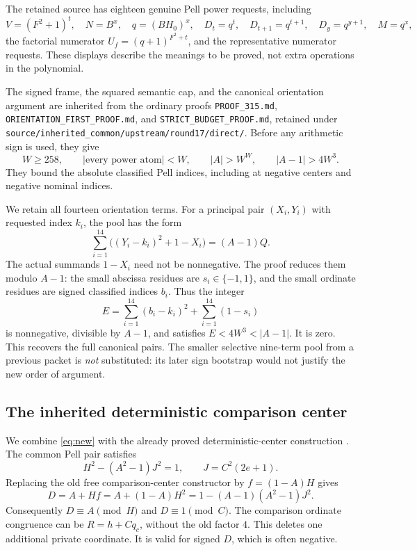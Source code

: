 \documentclass[11pt,letterpaper]{article}
\newcommand{\file}[1]{\texttt{\nolinkurl{#1}}}
\begin{document}
The retained source has eighteen genuine Pell power requests, including
\[
 V=(F^2+1)^t,\quad N=B^x,\quad q=(BH_0)^x,\quad
 D_t=q^t,\quad D_{t+1}=q^{t+1},\quad D_y=q^{y+1},\quad M=q^x,
\]
the factorial numerator $U_f=(q+1)^{F^2+t}$, and the representative
numerator requests. These displays describe the meanings to be proved,
not extra operations in the polynomial.

The signed frame, the squared semantic cap, and the canonical
orientation argument are inherited from the ordinary proofs
\file{PROOF_315.md}, \file{ORIENTATION_FIRST_PROOF.md}, and
\file{STRICT_BUDGET_PROOF.md}, retained under
\file{source/inherited_common/upstream/round17/direct/}.
Before any arithmetic sign is used, they give
\[
 W\ge258,\qquad |\text{every power atom}|<W,\qquad
 |A|>W^W,\qquad |A-1|>4W^3.
\]
They bound the absolute classified Pell indices, including at negative
centers and negative nominal indices.

We retain all fourteen orientation terms. For a principal pair
$(X_i,Y_i)$ with requested index $k_i$, the pool has the form
\begin{equation}\label{eq:pool}
 \sum_{i=1}^{14}\bigl((Y_i-k_i)^2+1-X_i\bigr)=(A-1)Q.
\end{equation}
The actual summands $1-X_i$ need not be nonnegative. The proof reduces
them modulo $A-1$: the small abscissa residues are
$s_i\in\{-1,1\}$, and the small ordinate residues are signed classified
indices $b_i$. Thus the integer
\[
 E=\sum_{i=1}^{14}(b_i-k_i)^2+\sum_{i=1}^{14}(1-s_i)
\]
is nonnegative, divisible by $A-1$, and satisfies
$E<4W^3<|A-1|$. It is zero. This recovers the full canonical pairs.
The smaller selective nine-term pool from a previous packet is
\emph{not} substituted: its later sign bootstrap would not justify
the new order of argument.

\subsection{The inherited deterministic comparison center}

We combine \eqref{eq:new} with the already proved deterministic-center
construction \cite{center}. The common Pell pair satisfies
\[
 H^2-(A^2-1)J^2=1,\qquad J=C^2(2e+1).
\]
Replacing the old free comparison-center constructor by
$f=(1-A)H$ gives
\[
 D=A+Hf
  =A+(1-A)H^2
  =1-(A-1)(A^2-1)J^2.
\]
Consequently $D\equiv A\pmod H$ and $D\equiv1\pmod C$. The comparison
ordinate congruence can be $R=h+Cq_c$, without the old factor $4$.
This deletes one additional private coordinate. It is valid for signed
$D$, which is often negative.
\end{document}
